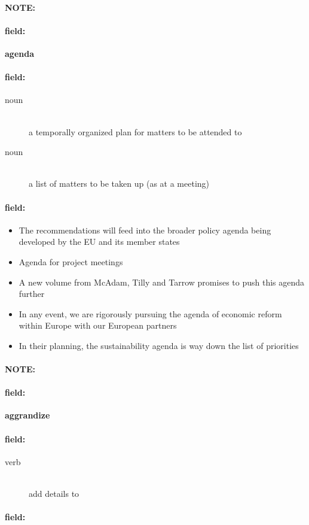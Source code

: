 \documentclass[12pt]{article}
\newenvironment{note}{\paragraph{NOTE:}}{}
\newenvironment{field}{\paragraph{field:}}{}
\begin{document}
\begin{note}
\begin{field}
\textbf{\large agenda}
\end{field}


\begin{field}
\begin{description}
\item[noun] \hfill \\ 
a temporally organized plan for matters to be attended to

\item[noun] \hfill \\ 
a list of matters to be taken up (as at a meeting)

\end{description}
\end{field}

\begin{field}
\begin{itemize}
\item The recommendations will feed into the broader policy agenda being developed by the EU and its member states
\item Agenda for project meetings
\item A new volume from McAdam, Tilly and Tarrow promises to push this agenda further
\item In any event, we are rigorously pursuing the agenda of economic reform within Europe with our European partners
\item In their planning, the sustainability agenda is way down the list of priorities
\end{itemize}
\end{field}
\end{note}
\begin{note}
\begin{field}
\textbf{\large aggrandize}
\end{field}


\begin{field}
\begin{description}
\item[verb] \hfill \\ 
add details to

\end{description}
\end{field}

\begin{field}
\end{field}
\end{note}
\end{document}
